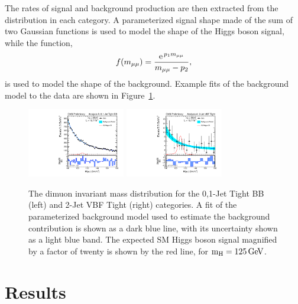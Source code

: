 \documentclass[10pt]{article}
\begin{document}
The rates of signal and background production are then extracted from the 
\Mmumu{} distribution 
in each category.  A parameterized signal shape made of the sum of
two Gaussian functions is used to model the shape of the Higgs boson signal, while
the function,
\begin{equation}
f(m_{\mu\mu}{}) = \frac{\mathrm{e}^{\,p_1 m_{\mu\mu}{}}}{m_{\mu\mu}{}-p_2},
\end{equation}
is used to model the shape of the background.
Example fits of the background model to the data are shown in Figure~\ref{fig:mass}.

\begin{figure}[htb]
\centering
\includegraphics[width=0.38\textwidth]{plotsPublic/mass_AnanlysisA/pdf/CombSplitAll_8TeV_125_Jets01PassPtG10BB.pdf}
\includegraphics[width=0.38\textwidth]{plotsPublic/mass_AnanlysisA/pdf/CombSplitAll_8TeV_125_Jet2CutsVBFPass.pdf}
\caption{ The dimuon invariant mass distribution for the 0,1-Jet Tight BB (left) and 2-Jet VBF Tight (right) categories.
            A fit of the parameterized background model used to estimate the background contribution is shown
            as a dark blue line, with its uncertainty shown as a light blue band.  The expected SM Higgs boson
            signal magnified by a factor of twenty is shown by the red line, for $\mathrm{m_H}{}=125\,\mathrm{Ge\kern -0.1em V}{}{}$.
            }
\label{fig:mass}
\end{figure}

\section{Results}
\end{document}
